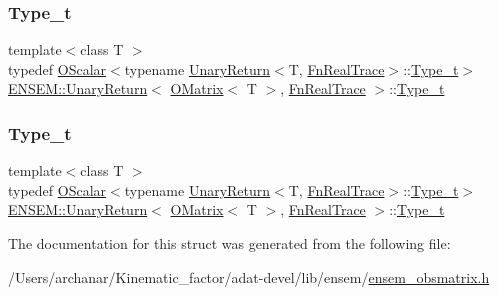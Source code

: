 \subsubsection{\texorpdfstring{Type\_t}{Type\_t}\hspace{0.1cm}{\footnotesize\ttfamily [2/3]}}
{\footnotesize\ttfamily template$<$class T $>$ \\
typedef \mbox{\hyperlink{classENSEM_1_1OScalar}{O\+Scalar}}$<$typename \mbox{\hyperlink{structENSEM_1_1UnaryReturn}{Unary\+Return}}$<$T, \mbox{\hyperlink{structENSEM_1_1FnRealTrace}{Fn\+Real\+Trace}}$>$\+::\mbox{\hyperlink{structENSEM_1_1UnaryReturn_3_01OMatrix_3_01T_01_4_00_01FnRealTrace_01_4_aaaa039ed6375a6c096ce155e79a2c9cd}{Type\+\_\+t}}$>$ \mbox{\hyperlink{structENSEM_1_1UnaryReturn}{E\+N\+S\+E\+M\+::\+Unary\+Return}}$<$ \mbox{\hyperlink{classENSEM_1_1OMatrix}{O\+Matrix}}$<$ T $>$, \mbox{\hyperlink{structENSEM_1_1FnRealTrace}{Fn\+Real\+Trace}} $>$\+::\mbox{\hyperlink{structENSEM_1_1UnaryReturn_3_01OMatrix_3_01T_01_4_00_01FnRealTrace_01_4_aaaa039ed6375a6c096ce155e79a2c9cd}{Type\+\_\+t}}}

\mbox{\label{structENSEM_1_1UnaryReturn_3_01OMatrix_3_01T_01_4_00_01FnRealTrace_01_4_aaaa039ed6375a6c096ce155e79a2c9cd}} 
\subsubsection{\texorpdfstring{Type\_t}{Type\_t}\hspace{0.1cm}{\footnotesize\ttfamily [3/3]}}
{\footnotesize\ttfamily template$<$class T $>$ \\
typedef \mbox{\hyperlink{classENSEM_1_1OScalar}{O\+Scalar}}$<$typename \mbox{\hyperlink{structENSEM_1_1UnaryReturn}{Unary\+Return}}$<$T, \mbox{\hyperlink{structENSEM_1_1FnRealTrace}{Fn\+Real\+Trace}}$>$\+::\mbox{\hyperlink{structENSEM_1_1UnaryReturn_3_01OMatrix_3_01T_01_4_00_01FnRealTrace_01_4_aaaa039ed6375a6c096ce155e79a2c9cd}{Type\+\_\+t}}$>$ \mbox{\hyperlink{structENSEM_1_1UnaryReturn}{E\+N\+S\+E\+M\+::\+Unary\+Return}}$<$ \mbox{\hyperlink{classENSEM_1_1OMatrix}{O\+Matrix}}$<$ T $>$, \mbox{\hyperlink{structENSEM_1_1FnRealTrace}{Fn\+Real\+Trace}} $>$\+::\mbox{\hyperlink{structENSEM_1_1UnaryReturn_3_01OMatrix_3_01T_01_4_00_01FnRealTrace_01_4_aaaa039ed6375a6c096ce155e79a2c9cd}{Type\+\_\+t}}}



The documentation for this struct was generated from the following file\+:\begin{DoxyCompactItemize}
\item 
/\+Users/archanar/\+Kinematic\+\_\+factor/adat-\/devel/lib/ensem/\mbox{\hyperlink{adat-devel_2lib_2ensem_2ensem__obsmatrix_8h}{ensem\+\_\+obsmatrix.\+h}}\end{DoxyCompactItemize}

